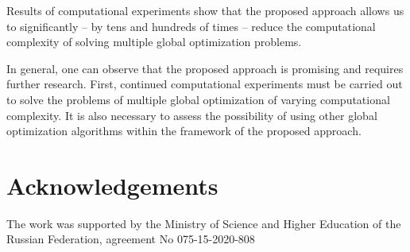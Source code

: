 \documentclass[review]{elsarticle}
\begin{document}
Results of computational experiments show that the proposed approach allows us to significantly -- by tens and hundreds of times -- reduce the computational complexity of solving multiple global optimization problems.

In general, one can observe that the proposed approach is promising and requires further research. First, continued computational experiments must be carried out to solve the problems of multiple global optimization of varying computational complexity. It is also necessary to assess the possibility of using other global optimization algorithms within the framework of the proposed approach.

\section*{Acknowledgements} 
The work was supported by the Ministry of Science and Higher Education of the Russian Federation, agreement No 075-15-2020-808


\end{document}
